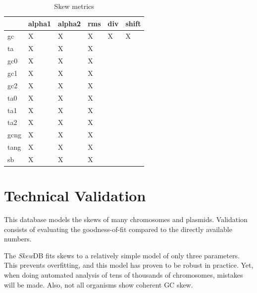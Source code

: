 \documentclass[fleqn,10pt]{wlscirep}
\begin{document}
\begin{table}[ht]
  \centering
\begin{tabular}{|l|l|l|l|ll}
\hline
     & alpha1 & alpha2 & rms & \multicolumn{1}{l|}{div} & \multicolumn{1}{l|}{shift} \\ \hline
gc   & X      &  X     &  X  & \multicolumn{1}{l|}{X}   & \multicolumn{1}{l|}{X}     \\ \hline
ta   & X      &  X     &  X  &                          &                            \\ \cline{1-4}
gc0  & X      &  X     &  X  &                          &                            \\ \cline{1-4}
gc1  & X      &  X     &  X  &                          &                            \\ \cline{1-4}
gc2  & X      &  X     &  X  &                          &                            \\ \cline{1-4}
ta0  & X      &  X     &  X  &                          &                            \\ \cline{1-4}
ta1  & X      &  X     &  X  &                          &                            \\ \cline{1-4}
ta2  & X      &  X     &  X  &                          &                            \\ \cline{1-4}
gcng & X      &  X     &  X  &                          &                            \\ \cline{1-4}
tang & X      &  X     &  X  &                          &                            \\ \cline{1-4}
sb   & X      &  X     &  X  &                          &                            \\ \cline{1-4}
\end{tabular}
\caption{Skew metrics}
\label{tab:skew-table}
\end{table}

\section*{Technical Validation}
This database models the skews of many chromosomes and plasmids. Validation consists of evaluating the goodness-of-fit compared to the directly available numbers.

The \emph{Skew}DB fits skews to a relatively simple model of only three parameters. This prevents overfitting, and this model has proven to be robust in practice. Yet, when doing automated analysis of tens of thousands of chromosomes, mistakes will be made. Also, not all organisms show coherent GC skew.
\end{document}
